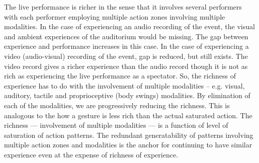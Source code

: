 The live performance is richer in the sense that it involves several performers with each performer employing multiple action zones involving multiple modalities. In the case of experiencing an audio recording of the event, the visual and ambient experiences of the auditorium would be missing. The gap between experience and performance increases in this case. In the case of experiencing a video (audio-visual) recording of the event, gap is reduced, but still exists. The video record gives a richer experience than the audio record though it is not as rich as experiencing the live performance as a spectator. So, the richness of experience has to do with the involvement of multiple modalities -- e.g. visual, auditory, tactile and proprioceptive (body swings) modalities. By elimination of each of the modalities, we are progressively reducing the richness. This is analogous to the how a gesture is less rich than the actual saturated action. The richness --- involvement of multiple modalities --- is a function of level of saturation of action patterns. The redundant generatability of patterns involving multiple action zones and modalities is the anchor for continuing to have similar experience even at the expense of richness of experience. 


